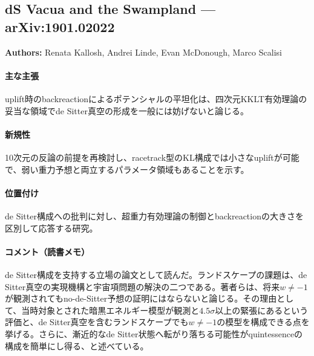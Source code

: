 \subsection{dS Vacua and the Swampland --- arXiv:1901.02022}

\textbf{Authors:} Renata Kallosh, Andrei Linde, Evan McDonough, Marco Scalisi

\paragraph{主な主張}
uplift時のbackreactionによるポテンシャルの平坦化は、四次元KKLT有効理論の妥当な領域でde Sitter真空の形成を一般には妨げないと論じる\cite{Kallosh:2019axr}。

\paragraph{新規性}
10次元の反論の前提を再検討し、racetrack型のKL構成では小さなupliftが可能で、弱い重力予想と両立するパラメータ領域もあることを示す。

\paragraph{位置付け}
de Sitter構成への批判に対し、超重力有効理論の制御とbackreactionの大きさを区別して応答する研究。

\paragraph{コメント（読書メモ）}
de Sitter構成を支持する立場の論文として読んだ。ランドスケープの課題は、de Sitter真空の実現機構と宇宙項問題の解決の二つである。著者らは、将来$w\neq-1$が観測されてもno-de-Sitter予想の証明にはならないと論じる。その理由として、当時対象とされた暗黒エネルギー模型が観測と$4.5\sigma$以上の緊張にあるという評価と、de Sitter真空を含むランドスケープでも$w\neq-1$の模型を構成できる点を挙げる。さらに、漸近的なde Sitter状態へ転がり落ちる可能性がquintessenceの構成を簡単にし得る、と述べている。
